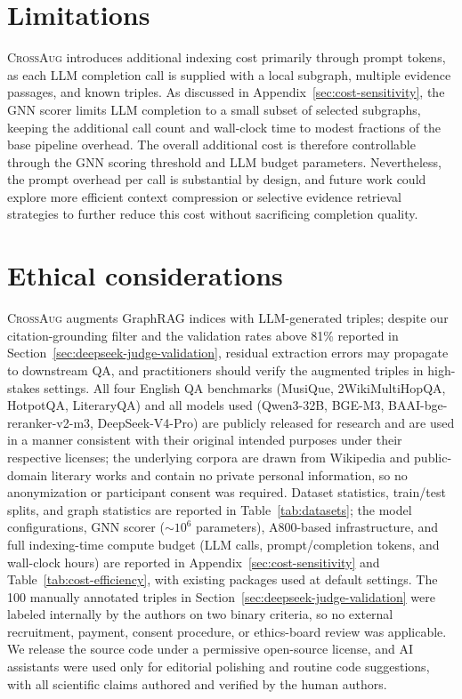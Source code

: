 \documentclass[11pt]{article}
\newcommand{\ours}{\textsc{CrossAug}\xspace}
\begin{document}
\clearpage
\section*{Limitations}

\ours introduces additional indexing cost primarily through prompt tokens, as each LLM completion call is supplied with a local subgraph, multiple evidence passages, and known triples. As discussed in Appendix~\ref{sec:cost-sensitivity}, the GNN scorer limits LLM completion to a small subset of selected subgraphs, keeping the additional call count and wall-clock time to modest fractions of the base pipeline overhead. The overall additional cost is therefore controllable through the GNN scoring threshold and LLM budget parameters. Nevertheless, the prompt overhead per call is substantial by design, and future work could explore more efficient context compression or selective evidence retrieval strategies to further reduce this cost without sacrificing completion quality.

\section*{Ethical considerations}

\ours augments GraphRAG indices with LLM-generated triples; despite our citation-grounding filter and the validation rates above 81\% reported in Section~\ref{sec:deepseek-judge-validation}, residual extraction errors may propagate to downstream QA, and practitioners should verify the augmented triples in high-stakes settings. All four English QA benchmarks (MusiQue, 2WikiMultiHopQA, HotpotQA, LiteraryQA) and all models used (Qwen3-32B, BGE-M3, BAAI-bge-reranker-v2-m3, DeepSeek-V4-Pro) are publicly released for research and are used in a manner consistent with their original intended purposes under their respective licenses; the underlying corpora are drawn from Wikipedia and public-domain literary works and contain no private personal information, so no anonymization or participant consent was required. Dataset statistics, train/test splits, and graph statistics are reported in Table~\ref{tab:datasets}; the model configurations, GNN scorer ($\sim$$10^6$ parameters), A800-based infrastructure, and full indexing-time compute budget (LLM calls, prompt/completion tokens, and wall-clock hours) are reported in Appendix~\ref{sec:cost-sensitivity} and Table~\ref{tab:cost-efficiency}, with existing packages used at default settings. The 100 manually annotated triples in Section~\ref{sec:deepseek-judge-validation} were labeled internally by the authors on two binary criteria, so no external recruitment, payment, consent procedure, or ethics-board review was applicable. We release the source code under a permissive open-source license, and AI assistants were used only for editorial polishing and routine code suggestions, with all scientific claims authored and verified by the human authors.
\end{document}
